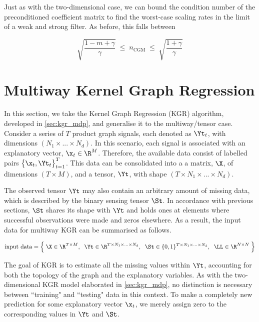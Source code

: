 Just as with the two-dimensional case, we can bound the condition number of the preconditioned coefficient matrix to find the worst-case scaling rates in the limit of a weak and strong filter. As before, this falls between

$$
\sqrt{\frac{1 - m + \gamma}{\gamma}} \; \leq \; n_{\text{CGM}} \; \leq \; \sqrt{\frac{1+\gamma}{\gamma}}
$$

\section{Multiway Kernel Graph Regression}

\label{sec:kgr_dd}

In this section, we take the Kernel Graph Regression (KGR) algorithm, developed in \cref{sec:kgr_mdp}, and generalise it to the multiway/tensor case. Consider a series of $T$ product graph signals, each denoted as $\Yt_t$, with dimensions $(N_1 \times ... \times N_d)$. In this scenario, each signal is associated with an explanatory vector, $\x_t \in \R^M$. Therefore, the available data consist of labelled pairs $\big\{\x_t, \Yt_t\big\}_{t=1}^T$. This data can be consolidated into a a matrix, $\X$, of dimensions $(T \times M)$, and a tensor, $\Yt$, with shape $(T \times N_1 \times ... \times N_d)$.

The observed tensor $\Yt$ may also contain an arbitrary amount of missing data, which is described by the binary sensing tensor $\St$. In accordance with previous sections, $\St$ shares its shape with $\Yt$ and holds ones at elements where successful observations were made and zeros elsewhere. As a result, the input data for multiway KGR can be summarised as follows.

\begin{equation*}
    \text{input data} = \Big\{ \; \X \in \R^{T \times M}, \;\; \Yt \in \R^{T \times N_1 \times ... \times N_d}, \;\; \St \in \{0, 1\}^{T \times N_1 \times ... \times N_d} , \;\; \LL \in \R^{N \times N} \; \Big\}
\end{equation*}

The goal of KGR is to estimate all the missing values within $\Yt$, accounting for both the topology of the graph and the explanatory variables. As with the two-dimensional KGR model elaborated in \cref{sec:kgr_mdp}, no distinction is necessary between ``training" and ``testing" data in this context. To make a completely new prediction for some explanatory vector $\x_t$, we merely assign zero to the corresponding values in $\Yt$ and $\St$.

